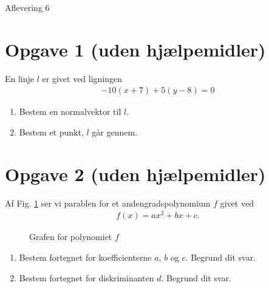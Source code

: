 \documentclass[12pt]{article}
\begin{document}


\begin{center}
\Huge
Aflevering 6
\end{center}

\section*{Opgave 1 (uden hjælpemidler)}

En linje $l$ er givet ved ligningen 
\begin{align*}
-10(x+7) + 5(y-8) = 0
\end{align*}
\begin{enumerate}[label=\roman*)]
\item Bestem en normalvektor til $l$.
\item Bestem et punkt, $l$ går gennem. 
\end{enumerate}


\section*{Opgave 2 (uden hjælpemidler)}

Af Fig. \ref{fig:poly} ser vi parablen for et andengradspolynomium $f$ givet ved
\begin{align*}
f(x)=ax^2+bx+c. 
\end{align*}

\begin{figure}[H]
\centering
{}
\caption{Grafen for polynomiet $f$}
\label{fig:poly}
\end{figure}

\begin{enumerate}[label=\roman*)]
\item Bestem fortegnet for koefficienterne $a$, $b$ og $c$. Begrund dit svar.
\item Bestem fortegnet for diskriminanten $d$. Begrund dit svar.
\end{enumerate}
\end{document}
